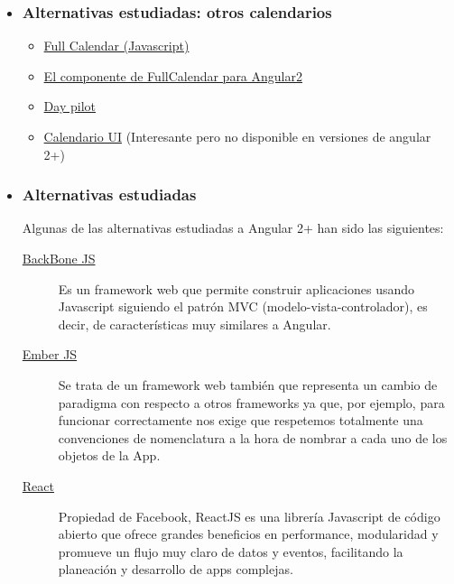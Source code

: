 \begin{itemize}
	\item \subsubsection{Alternativas estudiadas: otros calendarios} 
	\begin{itemize}
		\item \href{https://fullcalendar.io/}{Full Calendar (Javascript)}
		\item \href{https://github.com/nekken/ng2-fullcalendar}{El componente de FullCalendar para Angular2}
		\item \href{https://doc.daypilot.org/calendar/angular-2/}{Day pilot }
		\item \href{http://angular-ui.github.io/ui-calendar/}{Calendario UI} (Interesante pero no disponible en versiones de angular 2+)
	\end{itemize}
	\end{itemize}


\begin{itemize}
	\item	\subsubsection{Alternativas estudiadas}
	
	Algunas de las alternativas estudiadas a Angular 2+ han sido las siguientes:
	\begin{description}
\item[ \href{https://www.backbonejs.org/}{BackBone JS} ] Es un framework web que permite construir aplicaciones usando Javascript siguiendo el patrón MVC (modelo-vista-controlador), es decir, de características muy similares a Angular.
\item[ \href{https://www.emberjs.com/}{Ember JS} ] Se trata de un framework web también que representa un cambio de paradigma con respecto a otros frameworks ya que, por ejemplo, para funcionar correctamente nos exige que respetemos totalmente una convenciones de nomenclatura a la hora de nombrar a cada uno de los objetos de la App.
\item[ \href{https://facebook.github.io/react/}{React} ] Propiedad de Facebook, ReactJS es una librería Javascript de código abierto que ofrece grandes beneficios en performance, modularidad y promueve un flujo muy claro de datos y eventos, facilitando la planeación y desarrollo de apps complejas. 
\end{description}
\end{itemize}


